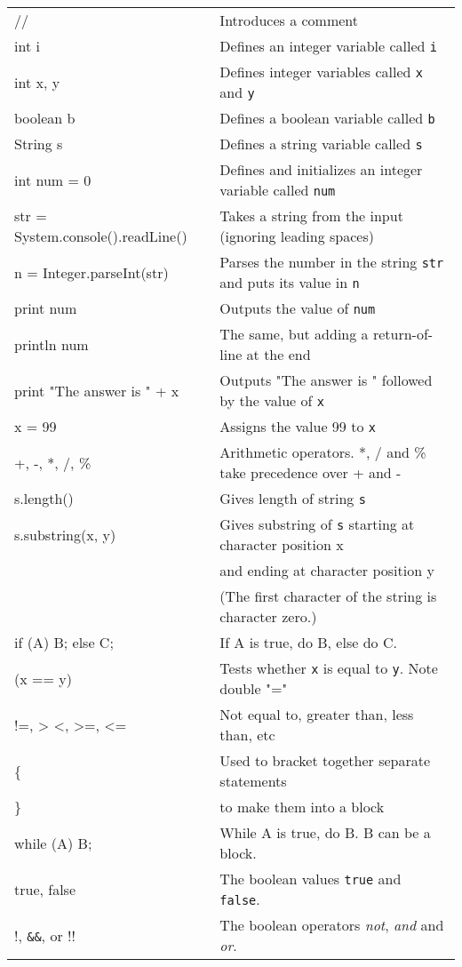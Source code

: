 
\begin{tabular}{p{6cm}p{7cm}}
// & Introduces a comment\\
int i & Defines an integer variable called \texttt{i}\\
int x, y & Defines integer variables called \texttt{x} and \texttt{y}\\
boolean b & Defines a boolean variable called \texttt{b}\\
String s & Defines a string variable called \texttt{s}\\
int num = 0 & Defines and initializes an integer variable called \texttt{num}\\
str = System.console().readLine() & Takes a string from the input
(ignoring leading spaces) \\
n = Integer.parseInt(str) & Parses the number in the string
\texttt{str} and puts its value in \texttt{n} \\
print num & Outputs the value of \texttt{num}\\
println num & The same, but adding a return-of-line at the end\\
print "The answer is " + x & Outputs "The answer is " followed by the value of \texttt{x}\\
x = 99 & Assigns the value 99 to \texttt{x}\\
+, -, *, /, \% & Arithmetic operators.  *, / and \% take precedence over + and -\\
s.length() & Gives length of string \texttt{s}\\
s.substring(x, y) & Gives substring of \texttt{s} starting at character position x \\
& and ending at character position y\\
 & (The first character of the string is character zero.)\\
if (A) B; else C; & If A is true, do B, else do C.\\
(x == y) & Tests whether \texttt{x} is equal to \texttt{y}.  Note double "="\\
!=, > <, >=, <= & Not equal to, greater than, less than, etc\\
\{ & Used to bracket together separate statements\\
\} & to make them into a block\\
while (A) B; & While A is true, do B.  B can be a block.\\
true, false & The boolean values \texttt{true} and\texttt{ false}.\\
!, \verb+&&+, or !!  & The boolean operators \emph{not}, \emph{and} and \emph{or}.\\
\end{tabular}
\vspace*{5pt}



